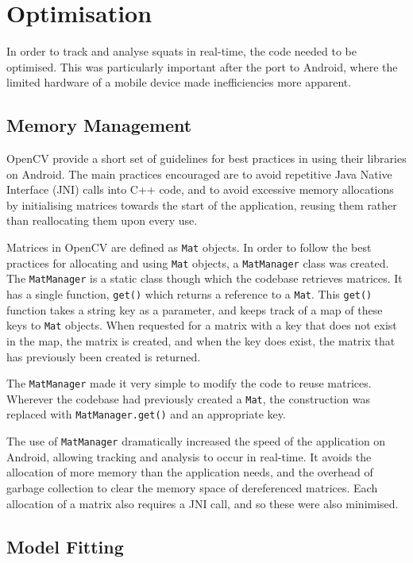 \section{Optimisation}

In order to track and analyse squats in real-time, the code needed to be optimised. This was particularly important after the port to Android, where the limited hardware of a mobile device made inefficiencies more apparent.

\subsection{Memory Management}

OpenCV provide a short set of guidelines for best practices in using their libraries on Android\cite{opencvoptim}. The main practices encouraged are to avoid repetitive Java Native Interface (JNI) calls into C++ code, and to avoid excessive memory allocations by initialising matrices towards the start of the application, reusing them rather than reallocating them upon every use.

Matrices in OpenCV are defined as \texttt{Mat} objects. In order to follow the best practices for allocating and using \texttt{Mat} objects, a \texttt{MatManager} class was created. The \texttt{MatManager} is a static class though which the codebase retrieves matrices. It has a single function, \texttt{get()} which returns a reference to a \texttt{Mat}. This \texttt{get()} function takes a string key as a parameter, and keeps track of a map of these keys to \texttt{Mat} objects. When requested for a matrix with a key that does not exist in the map, the matrix is created, and when the key does exist, the matrix that has previously been created is returned.

The \texttt{MatManager} made it very simple to modify the code to reuse matrices. Wherever the codebase had previously created a \texttt{Mat}, the construction was replaced with \texttt{MatManager.get()} and an appropriate key.

The use of \texttt{MatManager} dramatically increased the speed of the application on Android, allowing tracking and analysis to occur in real-time. It avoids the allocation of more memory than the application needs, and the overhead of garbage collection to clear the memory space of dereferenced matrices. Each allocation of a matrix also requires a JNI call, and so these were also minimised.

\subsection{Model Fitting}

